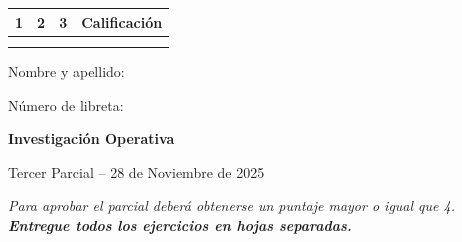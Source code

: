 \documentclass[a4paper,oneside,12pt]{amsart}
\newcommand{\nombremateria}
{Investigaci\'on Operativa}
\newcommand{\numeroparcial}
    { Tercer Parcial }
\newcommand{\fecha}
    {28 de Noviembre de 2025}
\theoremstyle{definition}
\begin{document}
\hfill \hfill
\begin{tabular}[c]{|c|c|c|c|}
\hline 
1 & 2 & 3 & Calificaci\'on \\ \hline \hline
\hspace{1.2 cm} & \hspace{1.2 cm} & \hspace{1.2 cm} &\hspace{1.5 cm} \\
\hspace{1.2 cm} & \hspace{1.2 cm} & \hspace{1.2 cm} &\hspace{1.5 cm} \\ \hline

\end{tabular}

\vspace{-1cm}

\noindent Nombre y apellido:

\vspace{0.2cm}

\noindent Número de libreta:

\noindent \hrulefill 

\smallskip
\renewcommand{\baselinestretch}{1.1}

\begin{center}
	\large \textbf{\nombremateria} 
	
	\numeroparcial -- \fecha
\end{center}

\noindent\textit{Para aprobar el parcial deberá obtenerse un puntaje mayor o igual que 4. \textbf{Entregue todos los ejercicios en hojas separadas.}}

\vspace{.6cm}
\renewcommand{\theenumi}{\textbf{\arabic{enumi}}}

\end{document}
